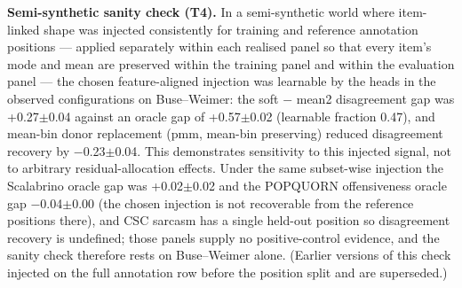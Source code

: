 \documentclass[10pt]{article}
\begin{document}
\textbf{Semi-synthetic sanity check (T4).} In a semi-synthetic world where item-linked shape was injected consistently for training and reference annotation positions --- applied separately within each realised panel so that every item's mode and mean are preserved within the training panel and within the evaluation panel --- the chosen feature-aligned injection was learnable by the heads in the observed configurations on Buse--Weimer: the soft $-$ mean2 disagreement gap was +0.27$\pm$0.04 against an oracle gap of +0.57$\pm$0.02 (learnable fraction 0.47), and mean-bin donor replacement (pmm, mean-bin preserving) reduced disagreement recovery by $-$0.23$\pm$0.04. This demonstrates sensitivity to this injected signal, not to arbitrary residual-allocation effects. Under the same subset-wise injection the Scalabrino oracle gap was +0.02$\pm$0.02 and the POPQUORN offensiveness oracle gap $-$0.04$\pm$0.00 (the chosen injection is not recoverable from the reference positions there), and CSC sarcasm has a single held-out position so disagreement recovery is undefined; those panels supply no positive-control evidence, and the sanity check therefore rests on Buse--Weimer alone. (Earlier versions of this check injected on the full annotation row before the position split and are superseded.)
\end{document}
